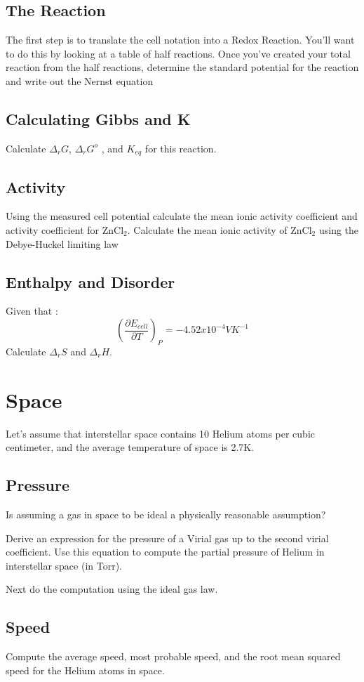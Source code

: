 \documentclass{article}
\newcommand{\be}{\begin{equation}}
\newcommand{\ee}{\end{equation}}
\newcommand{\pd}{\partial}
\begin{document}
\subsection{The Reaction}
The first step is to translate the cell notation into a Redox Reaction. 
You'll want to do this by looking at a table of half reactions. 
Once you've created your total reaction from the half reactions, determine the standard potential for the reaction and write out the Nernst equation 

\subsection{Calculating Gibbs and K}
Calculate $\Delta_r G$, $\Delta_r G^o$ , and $K_{eq}$ for this reaction. 

\subsection{Activity}
Using the measured cell potential calculate the mean ionic activity coefficient and activity coefficient for ZnCl$_2$.
Calculate the mean ionic activity of ZnCl$_2$ using the Debye-Huckel limiting law 

\subsection{Enthalpy and Disorder}
Given that :
\be
\left(\frac{\pd E_{cell}}{\pd T}\right)_P = -4.52 x 10^{-4} V K^{-1} 
\ee
Calculate $\Delta_r S$ and $\Delta_r H$. 

\section{Space}
Let's assume that interstellar space contains 10 Helium atoms per cubic centimeter, and the average temperature of space is 2.7K. 

\subsection{Pressure}
Is assuming a gas in space to be ideal a physically reasonable assumption?

Derive an expression for the pressure of a Virial gas up to the second virial coefficient. 
Use this equation to compute the partial pressure of Helium in interstellar space (in Torr). 

Next do the computation using the ideal gas law.

\subsection{Speed}
Compute the average speed, most probable speed, and the root mean squared speed for the Helium atoms in space. 
\end{document}
